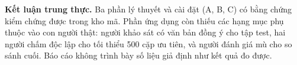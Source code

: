 \textbf{Kết luận trung thực.} Ba phần lý thuyết và cài đặt (A, B, C) có bằng chứng
kiểm chứng được trong kho mã. Phần ứng dụng còn thiếu các hạng mục phụ thuộc vào
con người thật: người khảo sát có văn bản đồng ý cho tập test, hai người chấm độc
lập cho tối thiểu 500 cặp ưu tiên, và người đánh giá mù cho so sánh cuối. Báo cáo
không trình bày số liệu giả định như kết quả đo được.
